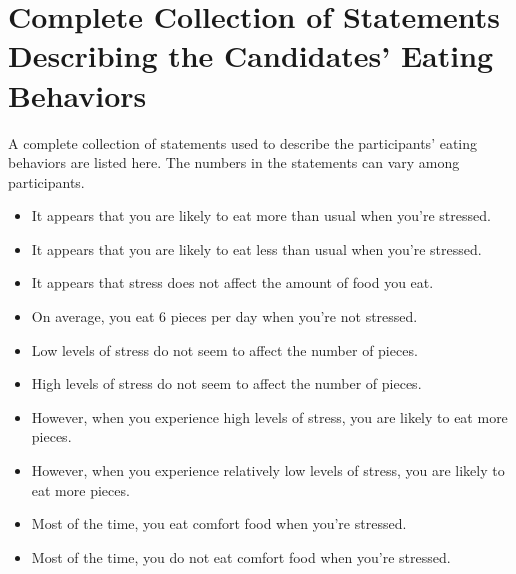 \section{Complete Collection of Statements Describing the Candidates' Eating Behaviors}\label{collect-statement}
A complete collection of statements used to describe the participants' eating behaviors are listed here. The numbers in the statements can vary among participants.
\begin{itemize}
  \item It appears that you are likely to eat more than usual when you're stressed.
  \item It appears that you are likely to eat less than usual when you're stressed.
  \item It appears that stress does not affect the amount of food you eat.
  \item On average, you eat 6 pieces per day when you're not stressed.
  \item Low levels of stress do not seem to affect the number of pieces.
  \item High levels of stress do not seem to affect the number of pieces.
  \item However, when you experience high levels of stress, you are likely to eat more pieces.
  \item However, when you experience relatively low levels of stress, you are likely to eat more pieces.
  \item Most of the time, you eat comfort food when you're stressed.
  \item Most of the time, you do not eat comfort food when you're stressed.
\end{itemize}
